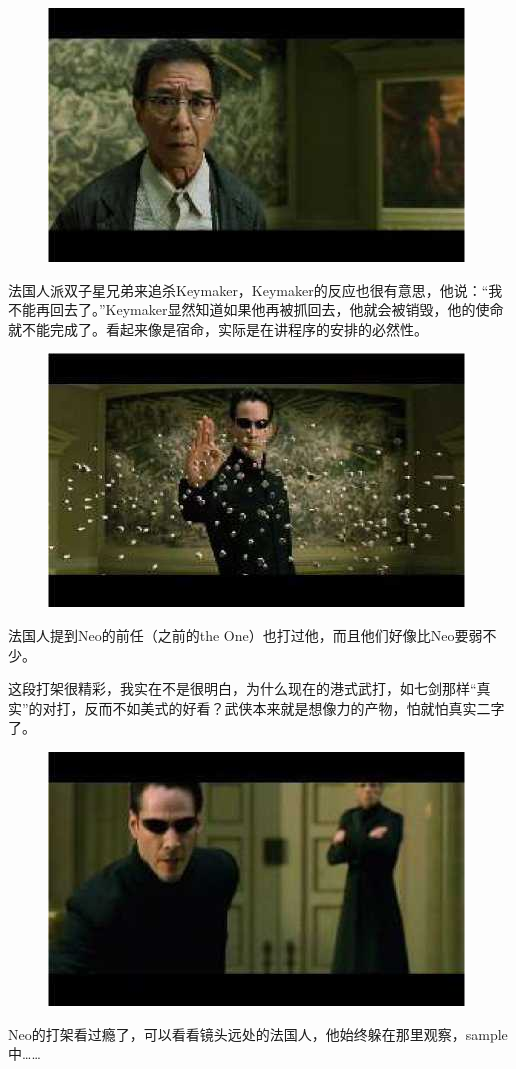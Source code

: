 \documentclass[UTF8]{ctexart}
\begin{document}
\begin{figure}[htb]
\centering
\includegraphics[width=0.5\linewidth]{fig/read_reloaded-119}
\end{figure}

法国人派双子星兄弟来追杀Keymaker，Keymaker的反应也很有意思，他说：“我不能再回去了。”Keymaker显然知道如果他再被抓回去，他就会被销毁，他的使命就不能完成了。看起来像是宿命，实际是在讲程序的安排的必然性。

\begin{figure}[htb]
\centering
\includegraphics[width=0.5\linewidth]{fig/read_reloaded-120}
\end{figure}

法国人提到Neo的前任（之前的the One）也打过他，而且他们好像比Neo要弱不少。

这段打架很精彩，我实在不是很明白，为什么现在的港式武打，如七剑那样“真实”的对打，反而不如美式的好看？武侠本来就是想像力的产物，怕就怕真实二字了。

\begin{figure}[htb]
\centering
\includegraphics[width=0.5\linewidth]{fig/read_reloaded-121}
\end{figure}

Neo的打架看过瘾了，可以看看镜头远处的法国人，他始终躲在那里观察，sample中……
\end{document}
